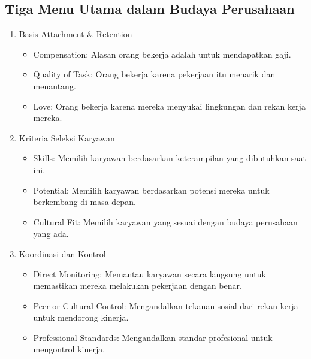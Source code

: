 \documentclass{article}
\begin{document}
\subsection{Tiga Menu Utama dalam Budaya Perusahaan}
\begin{enumerate}
    \item Basis Attachment \& Retention
          \begin{itemize}
              \item Compensation: Alasan orang bekerja adalah untuk mendapatkan gaji.
              \item Quality of Task: Orang bekerja karena pekerjaan itu menarik dan menantang.
              \item Love: Orang bekerja karena mereka menyukai lingkungan dan rekan kerja mereka.
          \end{itemize}
    \item Kriteria Seleksi Karyawan
          \begin{itemize}
              \item Skills: Memilih karyawan berdasarkan keterampilan yang dibutuhkan saat ini.
              \item Potential: Memilih karyawan berdasarkan potensi mereka untuk berkembang di masa depan.
              \item Cultural Fit: Memilih karyawan yang sesuai dengan budaya perusahaan yang ada.
          \end{itemize}
    \item Koordinasi dan Kontrol
          \begin{itemize}
              \item Direct Monitoring: Memantau karyawan secara langsung untuk memastikan mereka melakukan pekerjaan dengan benar.
              \item Peer or Cultural Control: Mengandalkan tekanan sosial dari rekan kerja untuk mendorong kinerja.
              \item Professional Standards: Mengandalkan standar profesional untuk mengontrol kinerja.
          \end{itemize}
\end{enumerate}
\end{document}
